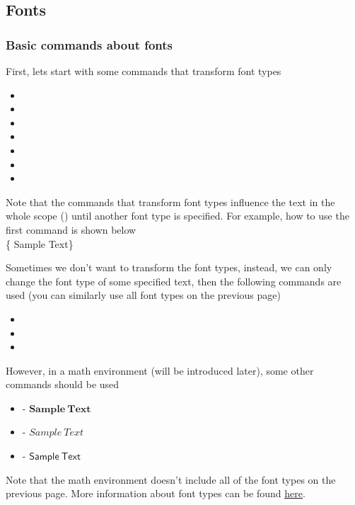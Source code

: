 \subsection{Fonts}

\begin{frame}
	\frametitle{Basic commands about fonts}
	First, lets start with some commands that transform font types
	\begin{itemize}
		\item {}
		\item {}
		\item {}
		\item {}
		\item {}
		\item {}
		\item {}
	\end{itemize}
	Note that the commands that transform font types influence the text in the whole scope () until another font type is specified. For example, how to use the first command  is shown below\\[0.5em]
	\{ Sample Text\}
\end{frame}

\begin{frame}
	Sometimes we don't want to transform the font types, instead, we can only change the font type of some specified text, then the following commands are used (you can similarly use all font types on the previous page)
	\begin{itemize}
		\item {}
		\item {}
		\item {}
	\end{itemize}
	However, in a math environment (will be introduced later), some other commands should be used
	\begin{itemize}
		\item {} - $\mathbf{Sample\ Text}$
		\item {} - $\mathit{Sample\ Text}$
		\item {} - $\mathsf{Sample\ Text}$
	\end{itemize}
	Note that the math environment doesn't include all of the font types on the previous page. More information about font types can be found \href{http://www.cnblogs.com/make217/p/6123532.html}{\color{blue}\underline{here}}.
\end{frame}

